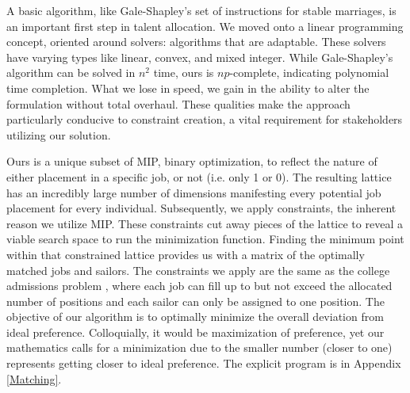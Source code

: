 A basic algorithm, like Gale-Shapley’s set of instructions for stable marriages, is an important first step in talent allocation. We moved onto a linear programming concept, oriented around solvers:  algorithms that are adaptable. These solvers have varying types like linear, convex, and mixed integer. While Gale-Shapley’s algorithm can be solved in $n^2$ time, ours is $np$-complete, indicating polynomial time completion. What we lose in speed, we gain in the ability to alter the formulation  without total overhaul. These qualities make the approach particularly conducive to constraint creation, a vital requirement for stakeholders utilizing our solution.

Ours is a unique subset of MIP, binary optimization, to reflect the nature of either placement in a specific job, or not (i.e. only 1 or 0). The resulting lattice has an incredibly large number of dimensions manifesting every potential job placement for every individual. Subsequently, we apply constraints, the inherent reason we utilize MIP. These constraints cut away pieces of the lattice to reveal a viable search space to run the minimization function. Finding the minimum point within that constrained lattice provides us with a matrix of the optimally matched jobs and sailors. The constraints we apply are the same as the college admissions problem \cite{1985_Roth}, where each job can fill up to but not exceed the allocated number of positions and each sailor can only be assigned to one position. The objective of our algorithm is to optimally minimize the overall deviation from ideal preference. Colloquially, it would be maximization of preference, yet our mathematics calls for a minimization due to the smaller number (closer to one) represents getting closer to ideal preference. The explicit program is in Appendix \ref{Matching}.